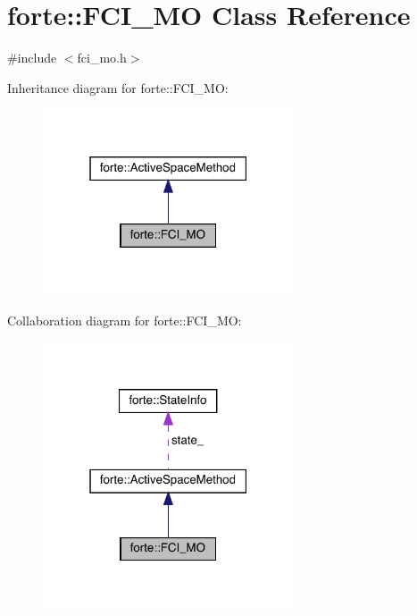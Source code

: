 \hypertarget{classforte_1_1_f_c_i___m_o}{}\section{forte\+:\+:F\+C\+I\+\_\+\+MO Class Reference}
\label{classforte_1_1_f_c_i___m_o}


{\ttfamily \#include $<$fci\+\_\+mo.\+h$>$}



Inheritance diagram for forte\+:\+:F\+C\+I\+\_\+\+MO\+:
\nopagebreak
\begin{figure}[H]
\begin{center}
\leavevmode
\includegraphics[width=211pt]{classforte_1_1_f_c_i___m_o__inherit__graph}
\end{center}
\end{figure}


Collaboration diagram for forte\+:\+:F\+C\+I\+\_\+\+MO\+:
\nopagebreak
\begin{figure}[H]
\begin{center}
\leavevmode
\includegraphics[width=211pt]{classforte_1_1_f_c_i___m_o__coll__graph}
\end{center}
\end{figure}
